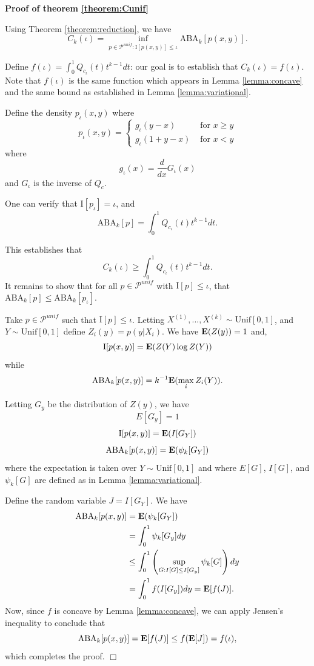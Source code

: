 \documentclass[12pt]{article}
\begin{document}
\textbf{Proof of theorem \ref{theorem:Cunif}}

Using Theorem \ref{theorem:reduction}, we have
\[
C_k(\iota) = \inf_{p \in \mathcal{P}^{unif}: \text{I}[p(x,y)] \leq \iota} \text{ABA}_k[p(x,y)].
\]

Define $f(\iota) = \int_0^1 Q_{c_\iota}(t) t^{k-1} dt$: our goal is to
establish that $C_k(\iota) = f(\iota)$.  
Note that $f(\iota)$
is the same function which appears in Lemma \ref{lemma:concave} and
the same bound as established in Lemma \ref{lemma:variational}.

Define the density $p_\iota(x, y)$ where
\[
p_\iota(x, y) = \begin{cases}
g_\iota(y - x) & \text{ for } x\geq y\\
g_\iota(1 + y - x) & \text{ for } x < y
\end{cases}
\]
where
\[
g_\iota(x) = \frac{d}{dx}G_\iota(x)
\]
and $G_\iota$ is the inverse of $Q_c$.

One can verify that $\text{I}[p_\iota] = \iota$, and 
\[
\text{ABA}_k[p] = \int_0^1 Q_{c_\iota}(t) t^{k-1} dt.
\]

This establishes that
\[
C_k(\iota) \geq \int_0^1 Q_{c_\iota}(t) t^{k-1} dt.
\]
It remains to show that for all $p \in \mathcal{P}^{unif}$ with
$\text{I}[p] \leq \iota$, that $\text{ABA}_k[p] \leq \text{ABA}_k[p_\iota]$.

Take $p \in \mathcal{P}^{unif}$ such that $\text{I}[p] \leq \iota$.
Letting $X^{(1)},...,X^{(k)} \sim \text{Unif}[0,1]$, and $Y \sim \text{Unif}[0,1]$ define $Z_i(y) = p(y|X_i)$.
We have $\textbf{E}(Z(y)) = 1$ and,
\[
\text{I}[p(x,y)] = \textbf{E}(Z(Y) \log Z(Y))
\]
while
\[
\text{ABA}_k[p(x,y)] = k^{-1}\textbf{E}(\max_i Z_i(Y)).
\]

Letting $G_y$ be the distribution of $Z(y)$, we have
\[
E[G_y] = 1
\]
\[
\text{I}[p(x,y)] = \textbf{E}(I[G_Y])
\]
\[
\text{ABA}_k[p(x,y)] = \textbf{E}(\psi_k[G_Y])
\]
where the expectation is taken over $Y \sim \text{Unif}[0,1]$ and
where $E[G]$, $I[G]$, and $\psi_k[G]$ are defined as in
Lemma \ref{lemma:variational}.

Define the random variable $J = I[G_Y]$.
We have
\begin{align*}
\text{ABA}_k[p(x,y)] &= \textbf{E}(\psi_k[G_Y])
\\&= \int_0^1 \psi_k[G_y] dy
\\&\leq \int_0^1 \left(\sup_{G: I[G] \leq I[G_y]} \psi_k[G]\right) dy
\\&= \int_0^1 f(I[G_y]) dy = \textbf{E}[f(J)].
\end{align*}
Now, since $f$ is concave by Lemma \ref{lemma:concave},
we can apply Jensen's inequality to conclude that
\[
\text{ABA}_k[p(x,y)] = \textbf{E}[f(J)] \leq f(\textbf{E}[J]) = f(\iota),
\]
which completes the proof. $\Box$
\end{document}
